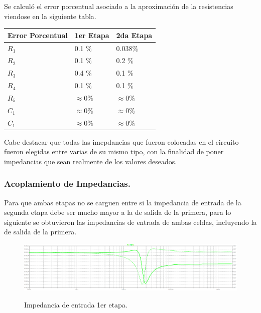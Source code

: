 Se calculó el error porcentual asociado a la aproximación de la resistencias viendose en la siguiente tabla.
\begin{table}[H]
\centering
\begin{tabular}{lll}
\multicolumn{1}{c}{Error Porcentual} & \multicolumn{1}{c}{1er Etapa} & \multicolumn{1}{c}{2da Etapa} \\ \hline
$R_1$                                & 0.1 $\%$                      & $0.038  \%$                   \\
$R_2$                                & 0.1 $\%$                      & 0.2 $\%$                      \\
$R_3$                                & 0.4 $\%$                      & 0.1 $\%$                      \\
$R_4$                                & 0.1 $\%$                      & 0.1 $\%$                      \\
$R_5$                                & $\approx 0 \%$                & $\approx 0 \%$                \\
$C_1$                                & $\approx 0 \%$                & $\approx 0 \%$                \\
$C_1$                                & $\approx 0 \%$                & $\approx 0 \%$               
\end{tabular}
\end{table}

Cabe destacar que todas las imepdancias que fueron colocadas en el circuito fueron elegidas entre varias de su mismo tipo, con la finalidad de poner impedancias que sean realmente de los valores deseados.

\subsubsection{Acoplamiento de Impedancias.}

Para que ambas etapas no se carguen entre si la impedancia de entrada de la segunda etapa debe ser mucho mayor a la de salida de la primera, para lo siguiente se obtuvieron las impedancias de entrada de ambas celdas, incluyendo la de salida de la primera.
\begin{figure}[H]
	\centering
	\includegraphics[width=\textwidth]{Imagenes-Ej2/ZinE1.png}
	\label{fig:graph}
	\caption{Impedancia de entrada 1er etapa.}
\end{figure}

